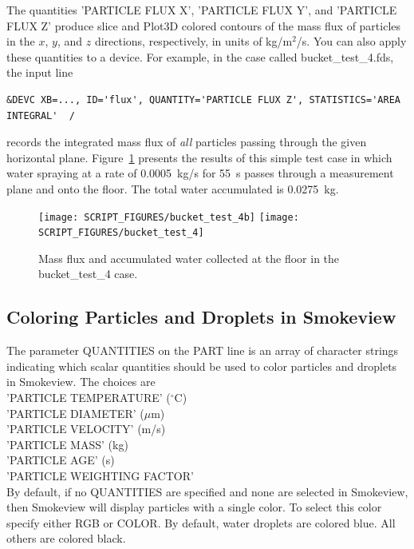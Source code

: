 \documentclass[11pt]{book}
\begin{document}
The quantities {\ct 'PARTICLE FLUX X'},  {\ct 'PARTICLE FLUX Y'}, and {\ct 'PARTICLE FLUX Z'} produce slice and Plot3D colored contours of the mass flux of particles in the $x$, $y$, and $z$ directions, respectively, in units of kg/m$^2$/s. You can also apply these quantities to a device. For example, in the case called {\ct bucket\_test\_4.fds}, the input line
\begin{lstlisting}
&DEVC XB=..., ID='flux', QUANTITY='PARTICLE FLUX Z', STATISTICS='AREA INTEGRAL'  /
\end{lstlisting}
records the integrated mass flux of {\em all} particles passing through the given horizontal plane. Figure~\ref{bucket_test_4_fig} presents the results of this simple test case in which water spraying at a rate of 0.0005~kg/s for 55~s passes through a measurement plane and onto the floor. The total water accumulated is 0.0275~kg.

\begin{figure}[ht]
\texttt{[image: SCRIPT\_FIGURES/bucket\_test\_4b]}
\texttt{[image: SCRIPT\_FIGURES/bucket\_test\_4]}
\caption[Results of the {\ct bucket\_test\_4} case]{Mass flux and accumulated water collected at the floor in the {\ct bucket\_test\_4} case.}
\label{bucket_test_4_fig}
\end{figure}


\subsection{Coloring Particles and Droplets in Smokeview}

The parameter {\ct QUANTITIES} on the {\ct PART} line is an array of character strings indicating which scalar quantities should be used to color particles and droplets in Smokeview. The choices are \\
{\ct 'PARTICLE TEMPERATURE'} ($^\circ$C) \\
{\ct 'PARTICLE DIAMETER'} ($\mu$m) \\
{\ct 'PARTICLE VELOCITY'} (m/s) \\
{\ct 'PARTICLE MASS'} (kg) \\
{\ct 'PARTICLE AGE'} (s) \\
{\ct 'PARTICLE WEIGHTING FACTOR'} \\
By default, if no {\ct QUANTITIES} are specified and none are selected in Smokeview, then Smokeview will display particles with a single color. To select this color specify either {\ct RGB} or {\ct COLOR}. By default, water droplets are colored blue. All others are colored black.
\end{document}
